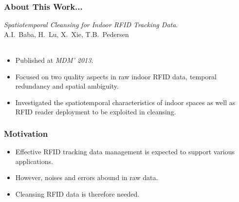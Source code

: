\begin{frame}
\frametitle{About This Work...}

\emph{Spatiotemporal Cleansing for Indoor RFID Tracking Data}.~\cite{baba2013spatiotemporal} \\
A.I.~Baba, H.~Lu, X.~Xie, T.B.~Pedersen\\~\\

\begin{itemize}
  \item Published at \emph{MDM' 2013}.
  \item Focused on two quality aspects in raw indoor RFID data, temporal redundancy and spatial ambiguity.
  \item Investigated the spatiotemporal characteristics of indoor spaces as well as RFID reader deployment to be exploited in cleansing.
\end{itemize}

\end{frame}


\begin{frame}
\frametitle{Motivation}

\begin{itemize}
  \item Effective RFID tracking data management is expected to support various applications.
  \item However, noises and errors abound in raw data.
  \item Cleansing RFID data is therefore needed.
\end{itemize}

\end{frame}

